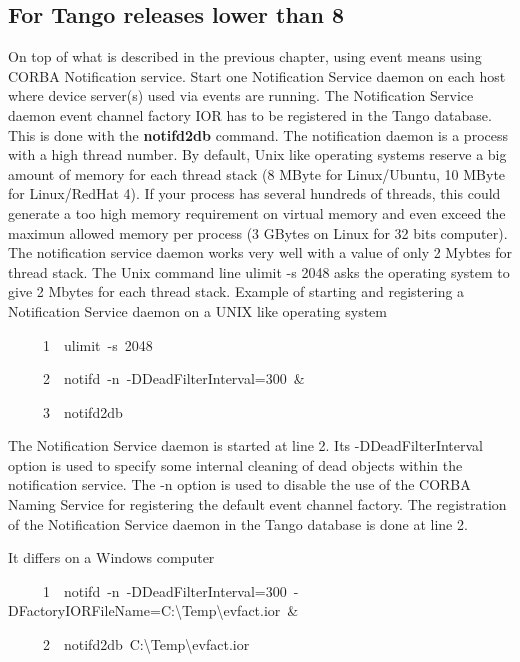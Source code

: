 \subsection{For Tango releases lower than 8}

On top of what is described in the previous chapter, using event means
using CORBA Notification service. Start one Notification Service
daemon on each host where device server(s) used via events are running.
The Notification Service daemon event channel factory IOR has to be
registered in the Tango database. This is done with the \textbf{notifd2db}
command. The notification daemon is a process with a high thread number.
By default, Unix like operating systems reserve a big amount of memory
for each thread stack (8 MByte for Linux/Ubuntu, 10 MByte for Linux/RedHat
4). If your process has several hundreds of threads, this could generate
a too high memory requirement on virtual memory and even exceed the
maximun allowed memory per process (3 GBytes on Linux for 32 bits
computer). The notification service daemon works very well with a
value of only 2 Mybtes for thread stack. The Unix command line \textquotedbl{}ulimit
-s 2048\textquotedbl{} asks the operating system to give 2 Mbytes
for each thread stack. Example of starting and registering a Notification
Service daemon on a UNIX like operating system


\begin{lyxcode}
~~~~~1~~ulimit~-s~2048

~~~~~2~~notifd~-n~-DDeadFilterInterval=300~\&

~~~~~3~~notifd2db
\end{lyxcode}


The Notification Service daemon is started at line 2. Its \textquotedbl{}-DDeadFilterInterval\textquotedbl{}
option is used to specify some internal cleaning of dead objects within
the notification service. The \textquotedbl{}-n\textquotedbl{} option
is used to disable the use of the CORBA Naming Service for registering
the default event channel factory. The registration of the Notification
Service daemon in the Tango database is done at line 2.

It differs on a Windows computer


\begin{lyxcode}
~~~~~1~~notifd~-n~-DDeadFilterInterval=300~-DFactoryIORFileName=C:\textbackslash{}Temp\textbackslash{}evfact.ior~\&

~~~~~2~~notifd2db~C:\textbackslash{}Temp\textbackslash{}evfact.ior
\end{lyxcode}



